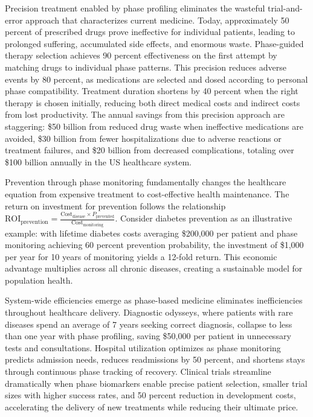 \documentclass[12pt,a4paper]{report}
\begin{document}
Precision treatment enabled by phase profiling eliminates the wasteful trial-and-error approach that characterizes current medicine. Today, approximately 50 percent of prescribed drugs prove ineffective for individual patients, leading to prolonged suffering, accumulated side effects, and enormous waste. Phase-guided therapy selection achieves 90 percent effectiveness on the first attempt by matching drugs to individual phase patterns. This precision reduces adverse events by 80 percent, as medications are selected and dosed according to personal phase compatibility. Treatment duration shortens by 40 percent when the right therapy is chosen initially, reducing both direct medical costs and indirect costs from lost productivity. The annual savings from this precision approach are staggering: \$50 billion from reduced drug waste when ineffective medications are avoided, \$30 billion from fewer hospitalizations due to adverse reactions or treatment failures, and \$20 billion from decreased complications, totaling over \$100 billion annually in the US healthcare system.

Prevention through phase monitoring fundamentally changes the healthcare equation from expensive treatment to cost-effective health maintenance. The return on investment for prevention follows the relationship $\text{ROI}_{\text{prevention}} = \frac{\text{Cost}_{\text{disease}} \times P_{\text{prevented}}}{\text{Cost}_{\text{monitoring}}}$. Consider diabetes prevention as an illustrative example: with lifetime diabetes costs averaging \$200,000 per patient and phase monitoring achieving 60 percent prevention probability, the investment of \$1,000 per year for 10 years of monitoring yields a 12-fold return. This economic advantage multiplies across all chronic diseases, creating a sustainable model for population health.

System-wide efficiencies emerge as phase-based medicine eliminates inefficiencies throughout healthcare delivery. Diagnostic odysseys, where patients with rare diseases spend an average of 7 years seeking correct diagnosis, collapse to less than one year with phase profiling, saving \$50,000 per patient in unnecessary tests and consultations. Hospital utilization optimizes as phase monitoring predicts admission needs, reduces readmissions by 50 percent, and shortens stays through continuous phase tracking of recovery. Clinical trials streamline dramatically when phase biomarkers enable precise patient selection, smaller trial sizes with higher success rates, and 50 percent reduction in development costs, accelerating the delivery of new treatments while reducing their ultimate price.
\end{document}
